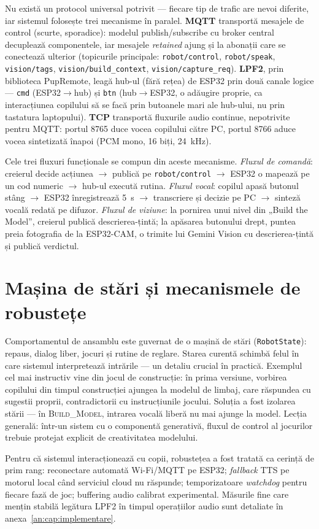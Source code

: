 Nu există un protocol universal potrivit — fiecare tip de trafic are nevoi diferite, iar sistemul folosește trei mecanisme în paralel. \textbf{MQTT} transportă mesajele de control (scurte, sporadice): modelul publish/subscribe cu broker central decuplează componentele, iar mesajele \emph{retained} ajung și la abonații care se conectează ulterior (topicurile principale: \texttt{robot/control}, \texttt{robot/speak}, \texttt{vision/tags}, \texttt{vision/build\_context}, \texttt{vision/capture\_req}). \textbf{LPF2}, prin biblioteca PupRemote, leagă hub-ul (fără rețea) de ESP32 prin două canale logice — \texttt{cmd} (ESP32$\rightarrow$hub) și \texttt{btn} (hub$\rightarrow$ESP32, o adăugire proprie, ca interacțiunea copilului să se facă prin butoanele mari ale hub-ului, nu prin tastatura laptopului). \textbf{TCP} transportă fluxurile audio continue, nepotrivite pentru MQTT: portul 8765 duce vocea copilului către PC, portul 8766 aduce vocea sintetizată înapoi (PCM mono, 16 biți, 24~kHz).

Cele trei fluxuri funcționale se compun din aceste mecanisme. \emph{Fluxul de comandă}: creierul decide acțiunea $\rightarrow$ publică pe \texttt{robot/control} $\rightarrow$ ESP32 o mapează pe un cod numeric $\rightarrow$ hub-ul execută rutina. \emph{Fluxul vocal}: copilul apasă butonul stâng $\rightarrow$ ESP32 înregistrează 5~s $\rightarrow$ transcriere și decizie pe PC $\rightarrow$ sinteză vocală redată pe difuzor. \emph{Fluxul de viziune}: la pornirea unui nivel din „Build the Model”, creierul publică descrierea-țintă; la apăsarea butonului drept, puntea preia fotografia de la ESP32-CAM, o trimite lui Gemini Vision cu descrierea-țintă și publică verdictul.

\section{Mașina de stări și mecanismele de robustețe}

Comportamentul de ansamblu este guvernat de o mașină de stări (\texttt{RobotState}): repaus, dialog liber, jocuri și rutine de reglare. Starea curentă schimbă felul în care sistemul interpretează intrările — un detaliu crucial în practică. Exemplul cel mai instructiv vine din jocul de construcție: în prima versiune, vorbirea copilului din timpul construcției ajungea la modelul de limbaj, care răspundea cu sugestii proprii, contradictorii cu instrucțiunile jocului. Soluția a fost izolarea stării — în \textsc{Build\_Model}, intrarea vocală liberă nu mai ajunge la model. Lecția generală: într-un sistem cu o componentă generativă, fluxul de control al jocurilor trebuie protejat explicit de creativitatea modelului.

Pentru că sistemul interacționează cu copii, robustețea a fost tratată ca cerință de prim rang: reconectare automată Wi-Fi/MQTT pe ESP32; \emph{fallback} TTS pe motorul local când serviciul cloud nu răspunde; temporizatoare \emph{watchdog} pentru fiecare fază de joc; buffering audio calibrat experimental. Măsurile fine care mențin stabilă legătura LPF2 în timpul operațiilor audio sunt detaliate în anexa~\ref{an:cap:implementare}.
